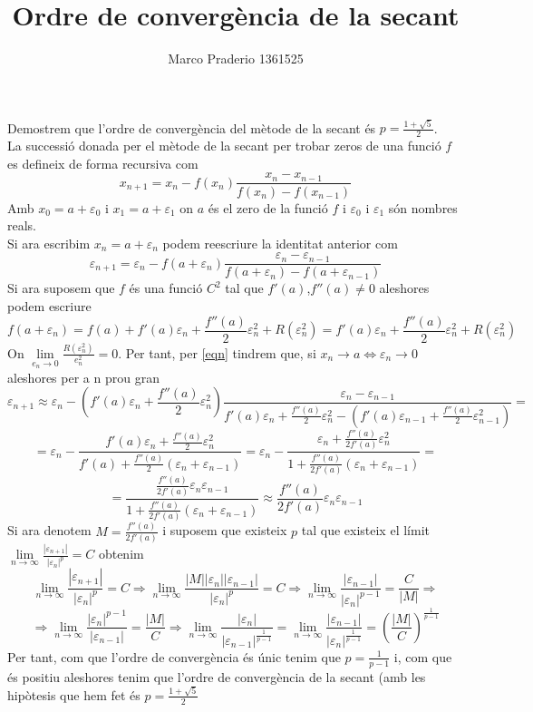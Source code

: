 \documentclass[a4paper,10pt]{article}
\title{Ordre de convergència de la secant}
\author{Marco Praderio 1361525}
\date{}
\renewcommand{\*}{\cdot}
\newcommand{\e}{\varepsilon}
\begin{document}
\maketitle
Demostrem que l'ordre de convergència del mètode de la secant és $p=\frac{1+\sqrt{5}}{2}$.\\
La successió donada per el mètode de la secant per trobar zeros de una funció $f$ es defineix de forma recursiva com
$$x_{n+1}=x_n-f(x_n)\frac{x_n-x_{n-1}}{f(x_n)-f(x_{n-1})}$$
Amb $x_0=a+\e_0$ i $x_1=a+\e_1$ on $a$ és el zero de la funció $f$ i $\e_0$ i $\e_1$ són nombres reals.\\
Si ara escribim $x_n=a+\e_n$ podem reescriure la identitat anterior com
\begin{equation}
\label{eqn}
\e_{n+1}=\e_n-f(a+\e_n)\frac{\e_n-\e_{n-1}}{f(a+\e_n)-f(a+\e_{n-1})}
\end{equation}
Si ara suposem que $f$ és una funció $C^2$ tal que $f'(a)$,$f''(a)\not=0$ aleshores podem escriure
\begin{equation*}
f(a+\e_n)=f(a)+f'(a)\e_n+\frac{f''(a)}{2}\e_n^2+R(\e_n^2)=f'(a)\e_n+\frac{f''(a)}{2}\e_n^2+R(\e_n^2)
\end{equation*}
On $\lim\limits_{e_n\to0}\frac{R(\e_n^2)}{e_n^2}=0$. Per tant, per \ref{eqn} tindrem que, si $x_n\to a \Leftrightarrow \e_n\to 0$ aleshores per a n prou gran
\begin{equation*}
 \e_{n+1}\approx\e_n-(f'(a)\e_n+\frac{f''(a)}{2}\e_n^2)\frac{\e_n-\e_{n-1}}{f'(a)\e_n+\frac{f''(a)}{2}\e_n^2-(f'(a)\e_{n-1}+
 \frac{f''(a)}{2}\e_{n-1}^2)}=
\end{equation*}
\begin{equation*}
 =\e_n-\frac{f'(a)\e_n+\frac{f''(a)}{2}\e_n^2}{f'(a)+\frac{f''(a)}{2}(\e_n+\e_{n-1})}=\e_n-\frac{\e_n+\frac{f''(a)}{2f'(a)}\e_n^2}{1+\frac{f''(a)}{2f'(a)}(\e_n+\e_{n-1})}=
\end{equation*}
\begin{equation*}
 =\frac{\frac{f''(a)}{2f'(a)}\e_n\e_{n-1}}{1+\frac{f''(a)}{2f'(a)}(\e_n+\e_{n-1})}\approx \frac{f''(a)}{2f'(a)}\e_n\e_{n-1}
\end{equation*}
Si ara denotem $M=\frac{f''(a)}{2f'(a)}$ i suposem que existeix $p$ tal que existeix el límit $\lim\limits_{n\to\infty}\frac{|\e_{n+1}|}{|\e_n|^p}=C$
obtenim
\begin{equation*}
\lim\limits_{n\to\infty}\frac{|\e_{n+1}|}{|\e_n|^p}=C \Rightarrow \lim\limits_{n\to\infty}\frac{|M||\e_n||\e_{n-1}|}{|\e_n|^p}=C
 \Rightarrow \lim\limits_{n\to\infty}\frac{|\e_{n-1}|}{|\e_n|^{p-1}}=\frac{C}{|M|} \Rightarrow
\end{equation*}
\begin{equation*}
 \Rightarrow \lim\limits_{n\to\infty}\frac{|\e_n|^{p-1}}{|\e_{n-1}|}=\frac{|M|}{C} \Rightarrow \lim\limits_{n\to\infty}\frac{|\e_n|}{|\e_{n-1}|^{\frac{1}{p-1}}}=
 \lim\limits_{n\to\infty}\frac{|\e_{n-1}|}{|\e_n|^{\frac{1}{p-1}}}=
 \left(\frac{|M|}{C}\right)^{\frac{1}{p-1}}
\end{equation*}
Per tant, com que l'ordre de convergència és únic tenim que $p=\frac{1}{p-1}$ i, com que és positiu aleshores tenim que l'ordre de convergència de la secant
(amb les hipòtesis que hem fet és $p=\frac{1+\sqrt{5}}{2}$
\end{document}
